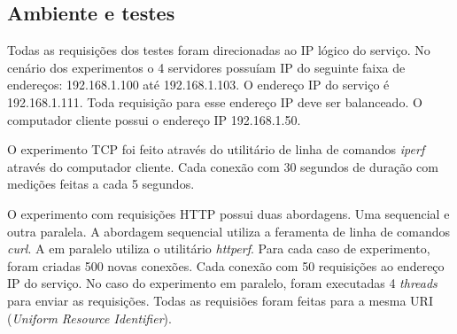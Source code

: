 \subsection{Ambiente e testes}

Todas as requisições dos testes foram direcionadas ao IP lógico do 
serviço.
No cenário dos experimentos o 4 servidores possuíam IP do seguinte faixa de 
endereços: 192.168.1.100 até 192.168.1.103.
O endereço IP do serviço é 192.168.1.111.
Toda requisição para esse endereço IP deve ser balanceado.
O computador cliente possui o endereço IP 192.168.1.50.

O experimento TCP foi feito através do utilitário de linha de comandos 
\emph{iperf} através do computador cliente.
Cada conexão com 30 segundos de duração com medições feitas a cada 5 segundos.

O experimento com requisições HTTP possui duas abordagens.
Uma sequencial e outra paralela.
A abordagem sequencial utiliza a feramenta de linha de comandos \emph{curl}.
A em paralelo utiliza o utilitário \emph{httperf}.
Para cada caso de experimento, foram criadas 500 novas conexões.
Cada conexão com 50 requisições ao endereço IP do serviço.
No caso do experimento em paralelo, foram executadas 4 \emph{threads} para 
enviar as requisições.
Todas as requisiões foram feitas para a mesma URI (\emph{Uniform Resource
Identifier}).
